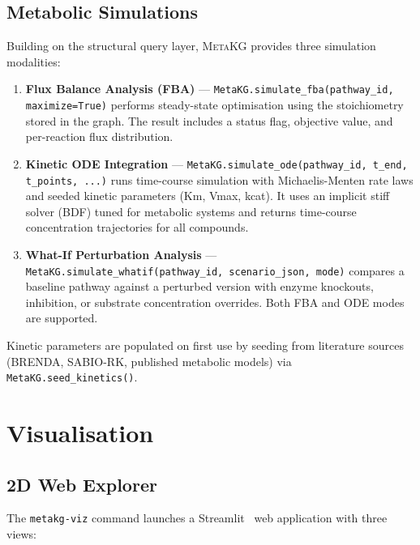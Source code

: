 \documentclass[10pt]{article}
\begin{document}
\subsection{Metabolic Simulations}

Building on the structural query layer, \textsc{MetaKG} provides three
simulation modalities:

\begin{enumerate}[leftmargin=*,itemsep=2pt]
  \item \textbf{Flux Balance Analysis (FBA)} ---
    \texttt{MetaKG.simulate\_fba(pathway\_id, maximize=True)} performs
    steady-state optimisation using the stoichiometry stored in the graph.
    The result includes a status flag, objective value, and per-reaction flux
    distribution.

  \item \textbf{Kinetic ODE Integration} ---
    \texttt{MetaKG.simulate\_ode(pathway\_id, t\_end, t\_points, ...)}
    runs time-course simulation with Michaelis-Menten rate laws and seeded
    kinetic parameters (Km, Vmax, kcat). It uses an implicit stiff solver
    (BDF) tuned for metabolic systems and returns time-course concentration
    trajectories for all compounds.

  \item \textbf{What-If Perturbation Analysis} ---
    \texttt{MetaKG.simulate\_whatif(pathway\_id, scenario\_json, mode)}
    compares a baseline pathway against a perturbed version with enzyme
    knockouts, inhibition, or substrate concentration overrides. Both FBA
    and ODE modes are supported.
\end{enumerate}

Kinetic parameters are populated on first use by seeding from literature
sources (BRENDA, SABIO-RK, published metabolic models) via
\texttt{MetaKG.seed\_kinetics()}.

\section{Visualisation}
\label{sec:viz}

\subsection{2D Web Explorer}

The \texttt{metakg-viz} command launches a Streamlit~\citep{streamlit2019}
web application with three views:
\end{document}
